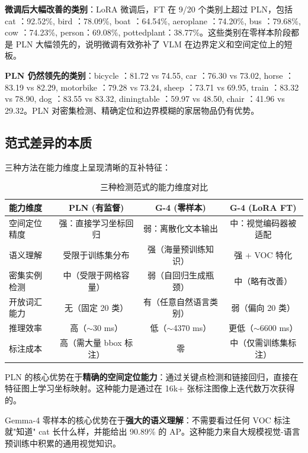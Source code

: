 \documentclass[12pt, a4paper]{article}
\begin{document}
\textbf{微调后大幅改善的类别}：LoRA 微调后，FT 在 9/20 个类别上超过 PLN，包括 cat ：92.52\%, bird ：78.09\%, boat ：64.54\%, aeroplane ：74.20\%, bus ：79.68\%, cow ：74.23\%, person：69.08\%, pottedplant：38.77\%。这些类别在零样本阶段都是 PLN 大幅领先的，说明微调有效弥补了 VLM 在边界定义和空间定位上的短板。

\textbf{PLN 仍然领先的类别}：bicycle ：81.72 vs 74.55, car ：76.30 vs 73.02, horse ：83.19 vs 82.29, motorbike ：79.28 vs 73.24, sheep ：73.71 vs 69.95, train ：83.32 vs 78.90, dog ：83.55 vs 83.32, diningtable ：59.97 vs 48.50, chair ：41.96 vs 29.32。PLN 对密集检测、精确定位和边界模糊的家居物品仍有优势。

\subsection{范式差异的本质}

三种方法在能力维度上呈现清晰的互补特征：

\begin{table}[H]
\centering
\caption{三种检测范式的能力维度对比}
\label{tab:capability}
\begin{tabular}{@{}lccc@{}}
\toprule
\textbf{能力维度} & \textbf{PLN (有监督)} & \textbf{G-4 (零样本)} & \textbf{G-4 (LoRA FT)} \\
\midrule
空间定位精度 & 强：直接学习坐标回归 & 弱：离散化文本输出 & 中：视觉编码器被适配 \\
语义理解 & 受限于训练集分布 & 强（海量预训练知识） & 强 + VOC 特化 \\
密集实例检测 & 中（受限于网格容量） & 弱（自回归生成瓶颈） & 中（略有改善） \\
开放词汇能力 & 无（固定 20 类） & 有（任意自然语言类别） & 弱（偏向 20 类） \\
推理效率 & 高（$\sim$30 ms） & 低（$\sim$4370 ms） & 更低（$\sim$6600 ms） \\
标注成本 & 高（需大量 bbox 标注） & 零 & 中（仅需训练集标注） \\
\bottomrule
\end{tabular}
\end{table}

PLN 的核心优势在于\textbf{精确的空间定位能力}：通过关键点检测和链接回归，直接在特征图上学习坐标映射。这种能力是通过在 16k+ 张标注图像上迭代数万次获得的。

Gemma-4 零样本的核心优势在于\textbf{强大的语义理解}：不需要看过任何 VOC 标注就"知道" cat 长什么样，并能给出 90.89\% 的 AP。这种能力来自大规模视觉-语言预训练中积累的通用视觉知识。
\end{document}
